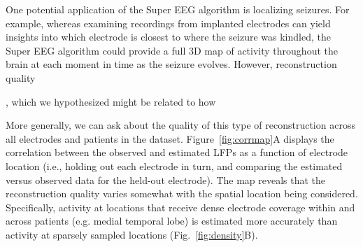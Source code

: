 







One potential application of the Super EEG algorithm is localizing
seizures.  For example, whereas examining recordings from implanted
electrodes can yield insights into which electrode is closest to where
the seizure was kindled, the Super EEG algorithm could provide a full 3D
map of activity throughout the brain at each moment in time as the
seizure evolves.  However, reconstruction quality



, which we hypothesized might be
related to how

More generally, we can ask about the quality of this type of
reconstruction across all electrodes and patients in the dataset.
Figure~\ref{fig:corrmap}A displays the correlation between the
observed and estimated LFPs as a function of electrode location (i.e.,
holding out each electrode in turn, and comparing the estimated versus
observed data for the held-out electrode).  The map
reveals that the reconstruction quality varies somewhat with the spatial
location being considered.  Specifically, activity at locations that
receive dense electrode coverage within and across patients
(e.g. medial temporal lobe) is estimated more accurately than activity
at sparsely sampled locations (Fig.~\ref{fig:density}B).  
